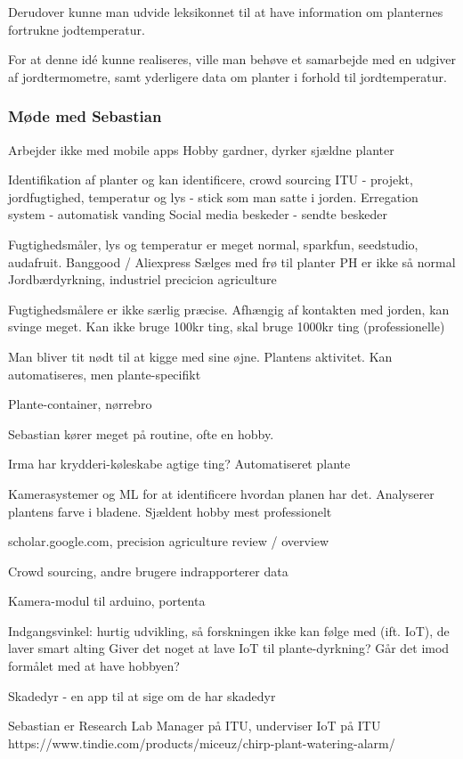 Derudover kunne man udvide leksikonnet til at have information om planternes fortrukne jodtemperatur.

For at denne idé kunne realiseres, ville man behøve et samarbejde med en udgiver af jordtermometre, samt yderligere data om planter i forhold til jordtemperatur.

\subsubsection*{Møde med Sebastian}
Arbejder ikke med mobile apps
Hobby gardner, dyrker sjældne planter

Identifikation af planter og kan identificere, crowd sourcing
ITU - projekt, jordfugtighed, temperatur og lys - stick som man satte i jorden.
	Erregation system - automatisk vanding
	Social media beskeder - sendte beskeder

Fugtighedsmåler, lys og temperatur er meget normal, sparkfun, seedstudio, audafruit. Banggood / Aliexpress
Sælges med frø til planter
PH er ikke så normal
Jordbærdyrkning, industriel precicion agriculture

Fugtighedsmålere er ikke særlig præcise. Afhængig af kontakten med jorden, kan svinge meget.
Kan ikke bruge 100kr ting, skal bruge 1000kr ting (professionelle)

Man bliver tit nødt til at kigge med sine øjne. Plantens aktivitet.
Kan automatiseres, men plante-specifikt

Plante-container, nørrebro

Sebastian kører meget på routine, ofte en hobby.

Irma har krydderi-køleskabe agtige ting? Automatiseret plante

Kamerasystemer og ML for at identificere hvordan planen har det. Analyserer plantens farve i bladene.
Sjældent hobby mest professionelt

scholar.google.com, precision agriculture review / overview

Crowd sourcing, andre brugere indrapporterer data

Kamera-modul til arduino, portenta

Indgangsvinkel: hurtig udvikling, så forskningen ikke kan følge med (ift. IoT), de laver smart alting
Giver det noget at lave IoT til plante-dyrkning? Går det imod formålet med at have hobbyen?

Skadedyr - en app til at sige om de har skadedyr

Sebastian er Research Lab Manager på ITU, underviser IoT på ITU
https://www.tindie.com/products/miceuz/chirp-plant-watering-alarm/

